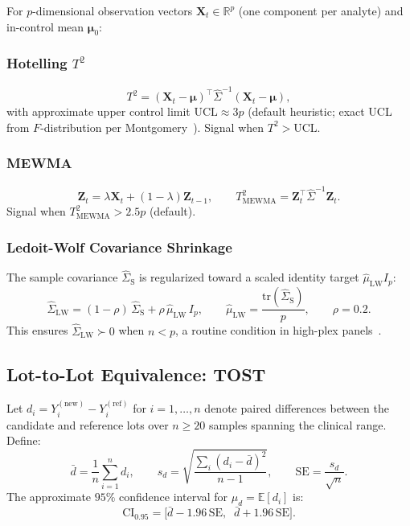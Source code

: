 \documentclass[11pt,a4paper]{article}
\begin{document}
For $p$-dimensional observation vectors $\mathbf{X}_t \in \mathbb{R}^p$
(one component per analyte) and in-control mean $\boldsymbol{\mu}_0$:

\subsubsection{Hotelling $T^2$}
\[
  T^2 = (\mathbf{X}_t - \boldsymbol{\mu})^\top \hat{\Sigma}^{-1}
         (\mathbf{X}_t - \boldsymbol{\mu}),
\]
with approximate upper control limit $\mathrm{UCL} \approx 3p$
(default heuristic; exact UCL from $F$-distribution per Montgomery~\cite{montgomery2007}).
Signal when $T^2 > \mathrm{UCL}$.

\subsubsection{MEWMA}
\[
  \mathbf{Z}_t = \lambda \mathbf{X}_t + (1 - \lambda)\mathbf{Z}_{t-1}, \qquad
  T^2_{\mathrm{MEWMA}} = \mathbf{Z}_t^\top \hat{\Sigma}^{-1} \mathbf{Z}_t.
\]
Signal when $T^2_{\mathrm{MEWMA}} > 2.5p$ (default).

\subsubsection{Ledoit-Wolf Covariance Shrinkage}

The sample covariance $\hat{\Sigma}_{\mathrm{S}}$ is regularized toward a
scaled identity target $\hat{\mu}_{\mathrm{LW}} I_p$:
\[
  \hat{\Sigma}_{\mathrm{LW}} = (1 - \rho)\,\hat{\Sigma}_{\mathrm{S}}
                              + \rho\,\hat{\mu}_{\mathrm{LW}}\,I_p,
  \qquad
  \hat{\mu}_{\mathrm{LW}} = \frac{\mathrm{tr}(\hat{\Sigma}_{\mathrm{S}})}{p},
  \qquad
  \rho = 0.2.
\]
This ensures $\hat{\Sigma}_{\mathrm{LW}} \succ 0$ when $n < p$, a
routine condition in high-plex panels~\cite{ledoit2004}.

\subsection{Lot-to-Lot Equivalence: TOST}
\label{sec:tost}

Let $d_i = Y_i^{(\mathrm{new})} - Y_i^{(\mathrm{ref})}$ for $i = 1,\ldots,n$
denote paired differences between the candidate and reference lots over $n \ge 20$
samples spanning the clinical range. Define:
\[
  \bar{d} = \frac{1}{n}\sum_{i=1}^n d_i, \qquad
  s_d = \sqrt{\frac{\sum_i (d_i - \bar{d})^2}{n-1}}, \qquad
  \mathrm{SE} = \frac{s_d}{\sqrt{n}}.
\]
The approximate $95\%$ confidence interval for $\mu_d = \mathbb{E}[d_i]$ is:
\[
  \mathrm{CI}_{0.95} = \bigl[\bar{d} - 1.96\,\mathrm{SE},\;\;
                              \bar{d} + 1.96\,\mathrm{SE}\bigr].
\]
\end{document}
